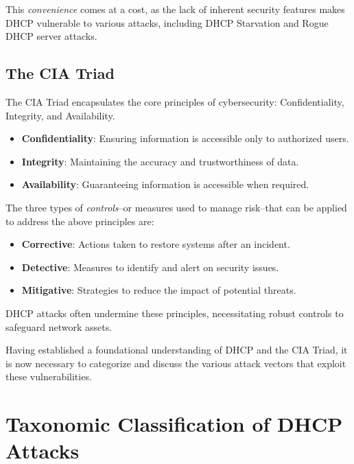 \documentclass[conference]{IEEEtran}
\begin{document}
        This \textit{convenience} comes at a cost, as the lack of inherent security features makes DHCP vulnerable to various attacks, including DHCP Starvation and Rogue DHCP server attacks.

    \subsection{The CIA Triad}
    \label{subsec:The_CIA_Triad}
        
        The CIA Triad encapsulates the core principles of cybersecurity: Confidentiality, Integrity, and Availability.
        
        \begin{itemize}
            \item \textbf{Confidentiality}: Ensuring information is accessible only to authorized users.
            \item \textbf{Integrity}: Maintaining the accuracy and trustworthiness of data.
            \item \textbf{Availability}: Guaranteeing information is accessible when required. 
        \end{itemize}

        The three types of \textit{controls}--or measures used to manage risk--that can be applied to address the above principles are:

        \begin{itemize}
            \item \textbf{Corrective}: Actions taken to restore systems after an incident.
            \item \textbf{Detective}: Measures to identify and alert on security issues.
            \item \textbf{Mitigative}: Strategies to reduce the impact of potential threats.
        \end{itemize}
        
        DHCP attacks often undermine these principles, necessitating robust controls to safeguard network assets.

    Having established a foundational understanding of DHCP and the CIA Triad, it is now necessary to categorize and discuss the various attack vectors that exploit these vulnerabilities.

\section{Taxonomic Classification of DHCP Attacks}
\label{sec:Taxonomic_Classification_of_DHCP_Attacks}
\end{document}
